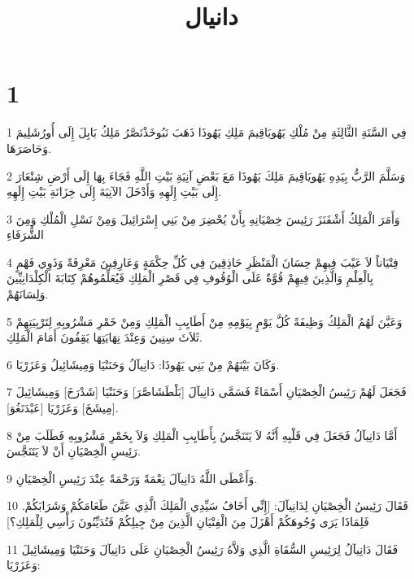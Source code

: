 

\title{دانيال}


\chapter{1}

\par 1 فِي السَّنَةِ الثَّالِثَةِ مِنْ مُلْكِ يَهُويَاقِيمَ مَلِكِ يَهُوذَا ذَهَبَ نَبُوخَذْنَصَّرُ مَلِكُ بَابِلَ إِلَى أُورُشَلِيمَ وَحَاصَرَهَا.
\par 2 وَسَلَّمَ الرَّبُّ بِيَدِهِ يَهُويَاقِيمَ مَلِكَ يَهُوذَا مَعَ بَعْضِ آنِيَةِ بَيْتِ اللَّهِ فَجَاءَ بِهَا إِلَى أَرْضِ شِنْعَارَ إِلَى بَيْتِ إِلَهِهِ وَأَدْخَلَ الآنِيَةَ إِلَى خِزَانَةِ بَيْتِ إِلَهِهِ.
\par 3 وَأَمَرَ الْمَلِكُ أَشْفَنَزَ رَئِيسَ خِصْيَانِهِ بِأَنْ يُحْضِرَ مِنْ بَنِي إِسْرَائِيلَ وَمِنْ نَسْلِ الْمُلْكِ وَمِنَ الشُّرَفَاءِ
\par 4 فِتْيَاناً لاَ عَيْبَ فِيهِمْ حِسَانَ الْمَنْظَرِ حَاذِقِينَ فِي كُلِّ حِكْمَةٍ وَعَارِفِينَ مَعْرِفَةً وَذَوِي فَهْمٍ بِالْعِلْمِ وَالَّذِينَ فِيهِمْ قُوَّةٌ عَلَى الْوُقُوفِ فِي قَصْرِ الْمَلِكِ فَيُعَلِّمُوهُمْ كِتَابَةَ الْكِلْدَانِيِّينَ وَلِسَانَهُمْ.
\par 5 وَعَيَّنَ لَهُمُ الْمَلِكُ وَظِيفَةً كُلَّ يَوْمٍ بِيَوْمِهِ مِنْ أَطَايِبِ الْمَلِكِ وَمِنْ خَمْرِ مَشْرُوبِهِ لِتَرْبِيَتِهِمْ ثَلاَثَ سِنِينَ وَعِنْدَ نِهَايَتِهَا يَقِفُونَ أَمَامَ الْمَلِكِ.
\par 6 وَكَانَ بَيْنَهُمْ مِنْ بَنِي يَهُوذَا: دَانِيآلُ وَحَنَنْيَا وَمِيشَائِيلُ وَعَزَرْيَا.
\par 7 فَجَعَلَ لَهُمْ رَئِيسُ الْخِصْيَانِ أَسْمَاءً فَسَمَّى دَانِيآلَ [بَلْطَشَاصَّرَ] وَحَنَنْيَا [شَدْرَخَ] وَمِيشَائِيلَ [مِيشَخَ] وَعَزَرْيَا [عَبْدَنَغُوَ].
\par 8 أَمَّا دَانِيآلُ فَجَعَلَ فِي قَلْبِهِ أَنَّهُ لاَ يَتَنَجَّسُ بِأَطَايِبِ الْمَلِكِ وَلاَ بِخَمْرِ مَشْرُوبِهِ فَطَلَبَ مِنْ رَئِيسِ الْخِصْيَانِ أَنْ لاَ يَتَنَجَّسَ.
\par 9 وَأَعْطَى اللَّهُ دَانِيآلَ نِعْمَةً وَرَحْمَةً عِنْدَ رَئِيسِ الْخِصْيَانِ.
\par 10 فَقَالَ رَئِيسُ الْخِصْيَانِ لِدَانِيآلَ: [إِنِّي أَخَافُ سَيِّدِي الْمَلِكَ الَّذِي عَيَّنَ طَعَامَكُمْ وَشَرَابَكُمْ. فَلِمَاذَا يَرَى وُجُوهَكُمْ أَهْزَلَ مِنَ الْفِتْيَانِ الَّذِينَ مِنْ جِيلِكُمْ فَتُدَيِّنُونَ رَأْسِي لِلْمَلِكِ؟]
\par 11 فَقَالَ دَانِيآلُ لِرَئِيسِ السُّقَاةِ الَّذِي وَلاَّهُ رَئِيسُ الْخِصْيَانِ عَلَى دَانِيآلَ وَحَنَنْيَا وَمِيشَائِيلَ وَعَزَرْيَا:
